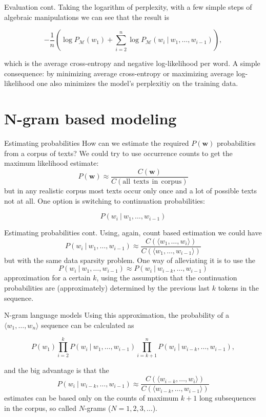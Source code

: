 \documentclass[style=upen, size=14pt]{powerdot}
\theoremstyle{definition}
\begin{document}
\begin{slide}[toc=]{Evaluation cont.}
  Taking the logarithm of perplexity, with a few simple steps of algebraic
  manipulations we can see that the result is

  $$
  - \frac{1}{n} \left(\log P_{\mathcal M}(w_1) + \sum_{i=2}^n\log P_{\mathcal M}(w_i ~\vert~ w_1,\dots, w_{i-1})\right),
$$

which is the average cross-entropy and negative log-likelihood per word. A
simple consequence: by minimizing average cross-entropy or maximizing average
log-likelihood one also minimizes the model's perplexitiy on the training data.
\end{slide}

\section{N-gram based modeling}

\begin{slide}[toc=Estimating probabilities]{Estimating  probabilities}
  How can we estimate the required $P(\mathbf{w})$ probabilities from a corpus
  of texts? We could try to use occurrence counts to get the maximum likelihood estimate:
  $$
  P(\mathbf{w}) \approx \frac{C(\mathbf{w})}{C(\mathrm{all~~texts~~in~~corpus})}
  $$
  but in any realistic corpus most texts occur only once and a lot of possible
  texts not at all. One option is switching to continuation probabilities: 
  
  $$
  P(w_{i} ~\vert~ w_1,\dots,w_{i-1})
  $$
\end{slide}

\begin{slide}[toc=]{Estimating  probabilities cont.}
  Using, again, count based estimation we could have
  $$
  P(w_{i} ~\vert~ w_1,\dots,w_{i-1}) \approx
  \frac{C(\langle w_1,\dots,w_{i} \rangle)}{C(\langle w_1,\dots,w_{i-1} \rangle
    )}
  $$
  but with the same data sparsity problem. One way of alleviating it is to use
  the
  $$
  P(w_{i} ~\vert~ w_1,\dots,w_{i-1}) \approx P(w_{i} ~\vert~
  w_{i-k},\dots,w_{i-1})
  $$
  approximation for a certain $k$, using the assumption that the continuation
  probabilities are (approximately) determined by the previous last $k$ tokens
  in the sequence.
\end{slide}

\begin{slide}[toc=N-grams]{N-gram language models}
  Using this approximation, the probability of a $\langle w_1,\dots,w_n \rangle$
  sequence can be calculated as
  \begin{small}
  $$
  P(w_1) \prod_{i=2}^k P(w_{i} ~\vert~ w_{1},\dots,w_{i-1})  \prod_{i=k+1}^n P(w_{i} ~\vert~ w_{i-k},\dots,w_{i-1}),
  $$
\end{small}
and the big advantage is that the
  $$
  P(w_{i} ~\vert~ w_{i-k},\dots,w_{i-1}) \approx
\frac{C(\langle w_{i-k},\dots,w_{i}\rangle)}{C(\langle w_{i-k},\dots,w_{i-1} \rangle)}
  $$
  estimates can be based only on the counts of maximum $k+1$ long subsequences
  in the corpus, so called $N$-grams ($N=1, 2, 3,\dots$).
\end{slide}
\end{document}

